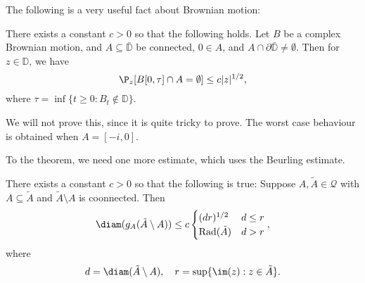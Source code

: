 \documentclass[a4paper]{article}
\renewcommand\D{\mathbb{D}}
\newcommand\rad{\mathrm{Rad}}
\begin{document}
The following is a very useful fact about Brownian motion:
\begin{thm}
  There exists a constant $c > 0$ so that the following holds. Let $B$ be a complex Brownian motion, and $A \subseteq \bar{\D}$ be connected, $0 \in A$, and $A \cap \partial \bar{\D} \not= \emptyset$. Then for $z \in \D$, we have
  \[
    \P_z[B[0, \tau] \cap A = \emptyset] \leq c |z|^{1/2},
  \]
  where $\tau = \inf \{t \geq 0: B_t \not \in \D\}$.\fakeqed
\end{thm}
We will not prove this, since it is quite tricky to prove. The worst case behaviour is obtained when $A = [-i, 0]$.

To the theorem, we need one more estimate, which uses the Beurling estimate.

\begin{prop}
  There exists a constant $c > 0$ so that the following is true: Suppose $A, \tilde{A} \in \mathcal{Q}$ with $A \subseteq \tilde{A}$ and $\tilde{A} \setminus A$ is coonnected. Then
  \[
    \diam(g_A(\tilde{A}\setminus A))\leq c
    \begin{cases}
      (dr)^{1/2} & d \leq r\\
      \rad(\tilde{A}) & d > r
    \end{cases},
  \]
  where
  \[
    d = \diam(\tilde{A} \setminus A),\quad r = \sup \{\im (z) : z \in \tilde{A}\}.
  \]
\end{prop}
\end{document}
